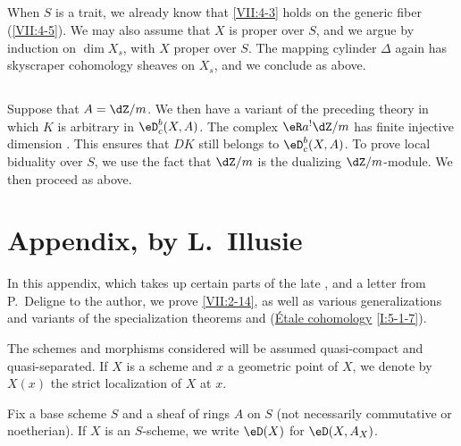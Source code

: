 \subsection{}\label{VII:4-6}

When $S$ is a trait, we already know that \ref{VII:4-3} holds on the generic
fiber (\ref{VII:4-5}). We may also assume that $X$ is proper over $S$, and we
argue by induction on $\dim{X_s}$, with $X$ proper over $S$. The mapping
cylinder $\Delta$ again has skyscraper cohomology sheaves on $X_s$, and we
conclude as above.





\subsection{}\label{VII:4-7}

Suppose that $A=\dZ/m$. We then have a variant of the preceding theory in
which $K$ is arbitrary in $\eD_c^b(X,A)$. The complex $\eR a^! \dZ/m$ has
finite injective dimension . This ensures that $D K$
still belongs to $\eD_c^b(X,A)$. To prove local biduality over $S$, we use the
fact that $\dZ/m$ is the dualizing $\dZ/m$-module. We then proceed as above.










\section{Appendix, by L.\ Illusie}\label{VII:5}

In this appendix, which takes up certain parts of the late
, and a letter from P.\ Deligne to the author, we prove
\ref{VII:2-14}, as well as various generalizations and variants of the
specialization theorems  and
(\hyperref[I]{Étale cohomology} \ref{I:5-1-7}).

The schemes and morphisms considered will be assumed quasi-compact and
quasi-separated. If $X$ is a scheme and $x$ a geometric point of $X$, we
denote by $X(x)$ the strict localization of $X$ at $x$.

Fix a base scheme $S$ and a sheaf of rings $A$ on $S$ (not necessarily
commutative or noetherian). If $X$ is an $S$-scheme, we write $\eD(X)$ for
$\eD(X,A_X)$.





